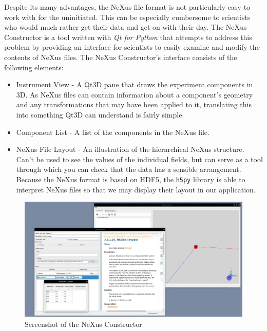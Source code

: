 Despite its many advantages, the NeXus file format is not particularly easy to work with for the uninitiated. This can be especially cumbersome to scientists who would much rather get their data and get on with their day. The NeXus Constructor is a tool written with \textit{Qt for Python} that attempts to address this problem by providing an interface for scientists to easily examine and modify the contents of NeXus files. The NeXus Constructor's interface consists of the following elements:


\begin{itemize}
\item Instrument View - A Qt3D pane that draws the experiment components in 3D. As NeXus files can contain information about a component's geometry and any transformations that may have been applied to it, translating this into something Qt3D can understand is fairly simple.
\item Component List - A list of the components in the NeXus file.
\item NeXus File Layout - An illustration of the hierarchical NeXus structure. Can't be used to see the values of the individual fields, but can serve as a tool through which you can check that the data has a sensible arrangement. Because the NeXus format is based on HDF5, the \texttt{h5py} library is able to interpret NeXus files so that we may display their layout in our application.
\end{itemize}

\begin{figure}
\caption{Screenshot of the NeXus Constructor}
\includegraphics[width=\linewidth]{screenshot.png}
\end{figure}
